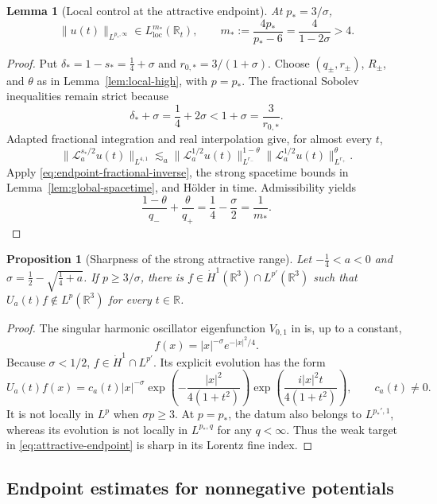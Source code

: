 \documentclass[preprint,12pt]{elsarticle}
\numberwithin{equation}{section}
\newtheorem{proposition}{Proposition}[section]
\newtheorem{lemma}{Lemma}[section]
\theoremstyle{definition}
\theoremstyle{remark}
\newcommand{\R}{\mathbb R}
\newcommand{\cL}{\mathcal L}
\newcommand{\norm}[2]{\lVert #1\rVert_{#2}}
\begin{document}
\begin{lemma}[Local control at the attractive endpoint]
\label{lem:endpoint-local-high}
At $p_*=3/\sigma$,
\[
 \norm{u(t)}{L^{p_*,\infty}}
 \in L_{\mathrm{loc}}^{m_*}(\R_t),
 \qquad
 m_*:=\frac{4p_*}{p_*-6}=\frac4{1-2\sigma}>4.
\]
\end{lemma}

\begin{proof}
Put $\delta_*=1-s_*=\frac14+\sigma$ and
$r_{0,*}=3/(1+\sigma)$. Choose $(q_\pm,r_\pm)$, $R_\pm$, and
$\theta$ as in Lemma~\ref{lem:local-high}, with $p=p_*$. The
fractional Sobolev inequalities remain strict because
\[
 \delta_*+\sigma=\frac14+2\sigma<1+\sigma=\frac3{r_{0,*}}.
\]
Adapted fractional integration and real interpolation give, for almost every $t$,
\[
 \norm{\cL_a^{s_*/2}u(t)}{L^{4,1}}
 \lesssim_a
 \norm{\cL_a^{1/2}u(t)}{L^{r_-}}^{1-\theta}
 \norm{\cL_a^{1/2}u(t)}{L^{r_+}}^\theta.
\]
Apply \eqref{eq:endpoint-fractional-inverse}, the strong spacetime
bounds in Lemma~\ref{lem:global-spacetime}, and H\"older in time.
Admissibility yields
\[
 \frac{1-\theta}{q_-}+\frac{\theta}{q_+}
 =\frac14-\frac\sigma2
 =\frac1{m_*}.
\]
\end{proof}

\begin{proposition}[Sharpness of the strong attractive range]
\label{prop:sharpness}
Let $-\frac14<a<0$ and
$\sigma=\frac12-\sqrt{\frac14+a}$.  If $p\geq3/\sigma$, there is
$f\in\dot H^1(\R^3)\cap L^{p'}(\R^3)$ such that
$U_a(t)f\notin L^p(\R^3)$ for every $t\in\R$.
\end{proposition}

\begin{proof}
The singular harmonic oscillator eigenfunction $V_{0,1}$ in
\cite[Eq.~(1.11) and Theorem~2.4]{FanelliFrequency} is, up to a
constant,
\[
 f(x)=|x|^{-\sigma}e^{-|x|^2/4}.
\]
Because $\sigma<1/2$, $f\in\dot H^1\cap L^{p'}$.  Its explicit
evolution has the form
\[
 U_a(t)f(x)=c_a(t)|x|^{-\sigma}
 \exp\left(-\frac{|x|^2}{4(1+t^2)}\right)
 \exp\left(\frac{i|x|^2t}{4(1+t^2)}\right),
 \qquad c_a(t)\neq0.
\]
It is not locally in $L^p$ when $\sigma p\geq3$.
At $p=p_*$, the datum also belongs to $L^{p_*',1}$, whereas its
evolution is not locally in $L^{p_*,q}$ for any $q<\infty$. Thus the
weak target in \eqref{eq:attractive-endpoint} is sharp in its Lorentz
fine index.
\end{proof}

\subsection{Endpoint estimates for nonnegative potentials}
\end{document}

